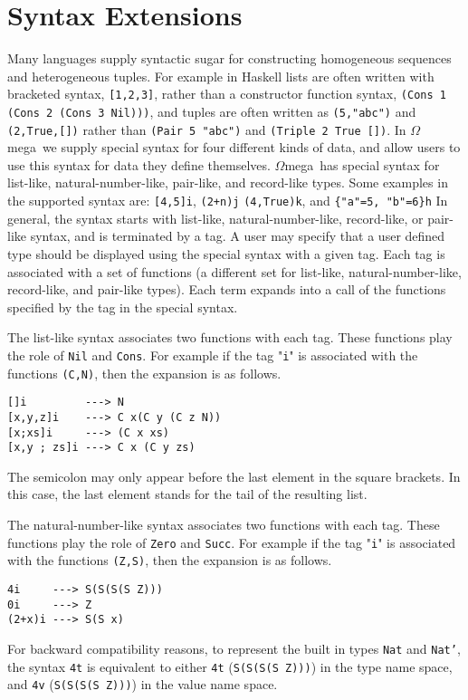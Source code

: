 \documentclass[11pt,twoside]{article}
\newcommand{\om}{$\Omega$mega}
\begin{document}
\section{Syntax Extensions} \label{synext}

Many languages supply syntactic sugar for constructing homogeneous sequences and
heterogeneous tuples. For example in Haskell lists are often
written with bracketed syntax, \verb+[1,2,3]+, rather than a constructor function syntax, \verb+(Cons 1 (Cons 2 (Cons 3 Nil)))+, and
tuples are often written as \verb+(5,"abc")+ and \verb+(2,True,[])+
rather than \verb+(Pair 5 "abc")+ and \verb+(Triple 2 True [])+. In \om\
we supply special syntax for four different kinds of data, and allow users to
use this syntax for data they define themselves. \om\ has
special syntax for list-like, natural-number-like, pair-like, and record-like types.
Some examples in the supported syntax are: \verb+[4,5]i+, \verb|(2+n)j|
\verb+(4,True)k+, and \verb+{"a"=5, "b"=6}h+ In general, the syntax starts 
with list-like, natural-number-like, record-like, or pair-like syntax,
and is terminated by a tag. A user may specify that 
a user defined type should be displayed using the special syntax with a given tag. Each
tag is associated with a set of functions (a different set for
list-like, natural-number-like, record-like, and pair-like types). Each
term expands into a call of the functions specified by the tag
in the special syntax.

The list-like syntax associates two functions with each
tag. These functions play the role of {\tt Nil} and {\tt Cons}.
For example if the tag "{\tt i}" is associated with
the functions {\tt (C,N)}, then the expansion is as follows.
\begin{verbatim}
[]i         ---> N
[x,y,z]i    ---> C x(C y (C z N))
[x;xs]i     ---> (C x xs)
[x,y ; zs]i ---> C x (C y zs)
\end{verbatim}
\noindent
The semicolon may only appear before the last element in the square brackets.
In this case, the last element stands for the tail of the resulting list.

The natural-number-like syntax associates two functions with each
tag. These functions play the role of {\tt Zero} and {\tt Succ}.
For example if the tag "{\tt i}" is associated with
the functions {\tt (Z,S)}, then the expansion is as follows.
\begin{verbatim}
4i     ---> S(S(S(S Z)))
0i     ---> Z
(2+x)i ---> S(S x)
\end{verbatim}
For backward compatibility reasons, to represent the
built in types {\tt Nat} and {\tt Nat'}, the syntax \verb+4t+ is equivalent
to either \verb+4t+ ({\tt  S(S(S(S Z)))}) in the type name space, and \verb+4v+ 
({\tt  S(S(S(S Z)))}) in the value name space.
\end{document}
